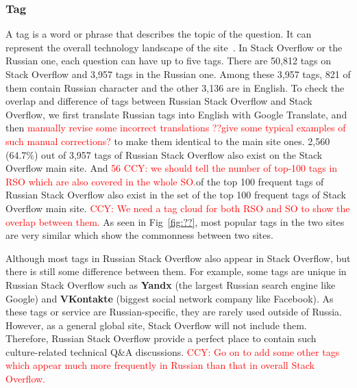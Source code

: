 \subsubsection{Tag}
A tag is a word or phrase that describes the topic of the question. 
It can represent the overall technology landscape of the site~\cite{???ChunyangKG}.
In Stack Overflow or the Russian one, each question can have up to five tags. 
There are 50,812 tags on Stack Overflow and 3,957 tags in the Russian one. 
Among these 3,957 tags, 821 of them contain Russian character and the other 3,136 are in English. 
To check the overlap and difference of tags between Russian Stack Overflow and Stack Overflow, we first translate Russian tags into English with Google Translate, and then \textcolor{red}{manually revise some incorrect translations ??give some typical examples of such manual corrections?} to make them identical to the main site ones.
2,560 (64.7\%) out of 3,957 tags of Russian Stack Overflow also exist on the Stack Overflow main site. 
And \textcolor{red}{56 CCY: we should tell the number of top-100 tags in RSO which are also covered in the whole SO.}of the top 100 frequent tags of Russian Stack Overflow also exist in the set of the top 100 frequent tags of Stack Overflow main site. 
\textcolor{red}{CCY: We need a tag cloud for both RSO and SO to show the overlap between them.}
As seen in Fig~\ref{fig:??}, most popular tags in the two sites are very similar which show the commonness between two sites.

Although most tags in Russian Stack Overflow also appear in Stack Overflow, but there is still some difference between them.
For example, some tags are unique in Russian Stack Overflow such as \textbf{Yandx} (the largest Russian search engine like Google) and \textbf{VKontakte} (biggest social network company like Facebook).
As these tags or service are Russian-specific, they are rarely used outside of Russia.
However, as a general global site, Stack Overflow will not include them.
Therefore, Russian Stack Overflow provide a perfect place to contain such culture-related technical Q\&A discussions.
\textcolor{red}{CCY: Go on to add some other tags which appear much more frequently in Russian than that in overall Stack Overflow.}

